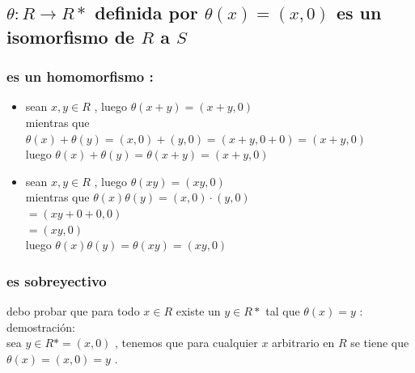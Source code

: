 \documentclass[10pt,a4paper]{article} %
\begin{document}
            \subsection{$ \theta : R \to R*   $ definida por $
            \theta(x) = (x,0)  $  es un isomorfismo de $ R  $ a $ S  $}
                \subsubsection{es un homomorfismo :}
                    \begin{itemize}
                        \item {
                                sean $ x , y \in R  $  , luego $ \theta (x+y) = (x+y,0)  $
                                \\
                                mientras que $ \theta (x) + \theta (y) = (x,0)
                                + (y,0) = (x+y , 0+0) = (x+y,0)  $
                                \\
                                luego $ \theta (x) + \theta (y) = \theta (x+y) = (x+y,0)  $
                            }
                        \item {
                                sean $ x , y \in R  $  , luego $ \theta(xy)  = (xy,0)  $
                                \\
                                mientras que $ \theta(x) \theta(y) = (x,0)\cdot (y,0)  $
                                \\
                                $ = (xy + 0 + 0 , 0 )  $
                                \\
                                $ = (xy,0)  $
                                \\
                                luego $ \theta (x) \theta (y) = \theta (xy) = (xy,0)  $
                            }
                    \end{itemize}
                \subsubsection{es sobreyectivo}
                    debo probar que para todo $ x \in R  $ existe un $ y \in R*  $ tal que $ \theta (x) = y  $ :
                    \\
                    demostración:
                    \\
                    sea $ y \in R* = (x , 0)  $  , tenemos que para cualquier $
                    x  $ arbitrario en $ R  $  se tiene que $ \theta (x) =
                    (x,0) = y  $ .
\end{document}
